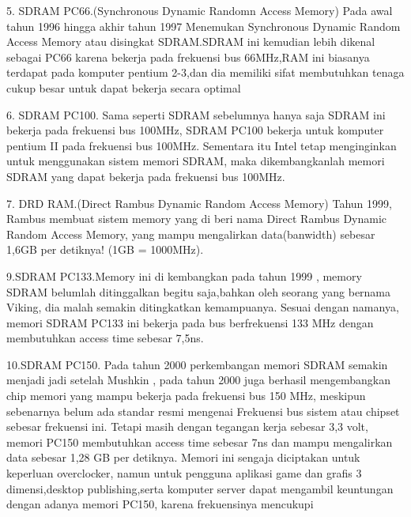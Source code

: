 5.	SDRAM PC66.(Synchronous Dynamic Randomn Access Memory) Pada awal tahun 1996 hingga akhir tahun 1997 Menemukan Synchronous Dynamic Random Access Memory atau disingkat SDRAM.SDRAM ini kemudian lebih dikenal sebagai PC66 karena bekerja pada frekuensi bus 66MHz,RAM ini biasanya terdapat pada komputer pentium 2-3,dan dia memiliki sifat membutuhkan tenaga cukup besar untuk dapat bekerja secara optimal

6. SDRAM PC100. Sama seperti SDRAM sebelumnya hanya saja SDRAM ini bekerja pada frekuensi bus 100MHz, SDRAM PC100 bekerja untuk komputer pentium II pada frekuensi bus 100MHz. Sementara itu Intel tetap menginginkan untuk menggunakan sistem memori SDRAM, maka dikembangkanlah memori SDRAM yang dapat bekerja pada frekuensi bus 100MHz.

7. DRD RAM.(Direct Rambus Dynamic Random Access Memory) Tahun 1999, Rambus membuat sistem memory yang di beri nama Direct Rambus Dynamic Random Access Memory, yang mampu mengalirkan data(banwidth) sebesar 1,6GB per detiknya! (1GB = 1000MHz).















9.SDRAM PC133.Memory ini di kembangkan pada tahun 1999 , memory SDRAM belumlah ditinggalkan begitu saja,bahkan oleh seorang yang bernama Viking, dia malah semakin ditingkatkan kemampuanya. Sesuai dengan namanya, memori SDRAM PC133 ini bekerja pada bus berfrekuensi 133 MHz dengan membutuhkan access time sebesar 7,5ns.

10.SDRAM PC150. Pada tahun 2000 perkembangan memori SDRAM semakin menjadi jadi setelah Mushkin , pada tahun 2000 juga berhasil mengembangkan chip memori yang mampu bekerja pada frekuensi bus 150 MHz, meskipun sebenarnya belum ada standar resmi mengenai Frekuensi bus sistem atau chipset sebesar frekuensi ini. Tetapi masih dengan tegangan kerja sebesar 3,3 volt, memori PC150 membutuhkan access time sebesar 7ns dan mampu mengalirkan data sebesar 1,28 GB per detiknya. Memori ini sengaja diciptakan untuk keperluan overclocker, namun untuk pengguna aplikasi game dan grafis 3 dimensi,desktop publishing,serta komputer server dapat mengambil keuntungan dengan adanya memori PC150, karena frekuensinya mencukupi